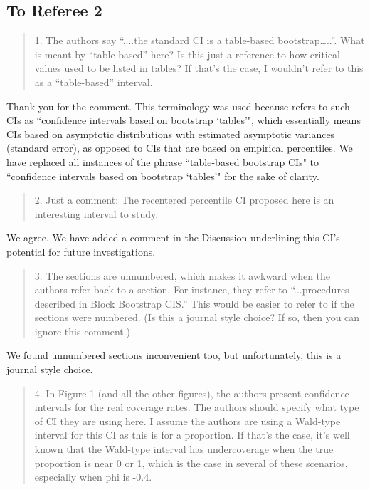 \documentclass[12pt]{article}
\newenvironment{comment}%
{\begin{quotation}\noindent\small\it\color{darkblue}\ignorespaces%
}{\end{quotation}}
\begin{document}
\subsection*{To Referee 2}

\begin{comment}
1. The authors say “....the standard CI is a table-based bootstrap…..”.  
What is meant by “table-based” here?  Is this just a reference to how critical 
values used to be listed in tables?  If that’s the case, I wouldn’t refer to 
this as a “table-based” interval. 
\end{comment}

Thank you for the comment.  This terminology was used because 
\citet{efron1993introduction} refers to such CIs as
``confidence intervals based on 
bootstrap `tables'", which essentially means CIs based on asymptotic 
distributions with estimated asymptotic variances (standard error), as opposed
to CIs that are based on empirical percentiles.
We have replaced all instances of the phrase 
``table-based bootstrap CIs" to ``confidence intervals based on bootstrap 
`tables'" for the sake of clarity.



\begin{comment}
2. Just a comment: The recentered percentile CI proposed here is an interesting 
interval to study. 
\end{comment}

We agree. We have added a comment in the Discussion underlining this CI's
potential for future investigations.

\begin{comment}
3. The sections are unnumbered, which makes it awkward when the
authors refer back
to a section.  For instance, they refer to “...procedures described in Block 
Bootstrap CIS.”  This would be easier to refer to if the sections were numbered.  
(Is this a journal style choice?  If so, then you can ignore this comment.)
\end{comment}

We found unnumbered sections inconvenient too, but unfortunately, 
this is a journal style choice.

\begin{comment}
4.  In Figure 1 (and all the other figures), the authors present confidence 
intervals for the real coverage rates.  The authors should specify what type of 
CI they are using here.  I assume the authors are using a Wald-type interval for 
this CI as this is for a proportion.  If that’s the case, it’s well known that 
the Wald-type interval has undercoverage when the true proportion is near 0 or 
1, which is the case in several of these scenarios, especially when phi is -0.4. 
\end{comment}
\end{document}
